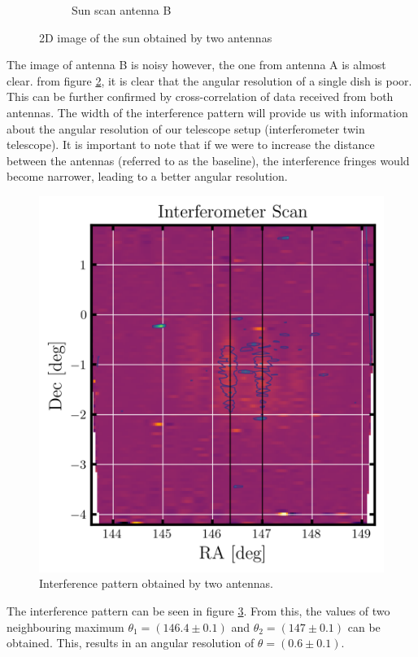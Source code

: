 \documentclass[12pt]{article}
\begin{document}
\begin{figure}[H]
\begin{subfigure}{.45\textwidth}
         \caption{Sun scan antenna B}
         \label{fig2.9}
     \end{subfigure}
        \caption{2D image of the sun obtained by two antennas}
        \label{fig2.89}
 \end{figure}

 The image of antenna B is noisy however, the one from antenna A is almost clear. from figure \ref{fig2.89}, it is clear that the angular resolution of a single dish is poor. This can be further confirmed by cross-correlation of data received from both antennas. The width of the interference pattern will provide us with information about the angular resolution of our telescope setup (interferometer twin telescope). It is important to note that if we were to increase the distance between the antennas (referred to as the baseline), the interference fringes would become narrower, leading to a better angular resolution.   
 \begin{figure}[H]
    \centering
    \includegraphics[scale=1]{fig/9.Interfscan.png}
    \caption{Interference pattern obtained by two antennas.}
    \label{fig2.10}
 \end{figure}

 The interference pattern can be seen in figure \ref{fig2.10}. From this, the values of two neighbouring maximum $\theta_1 = (146.4 \pm 0.1)$ and $\theta_2 = (147 \pm 0.1)$ can be obtained. This, results in an angular resolution of $\theta = (0.6 \pm 0.1)$. 
\end{document}

